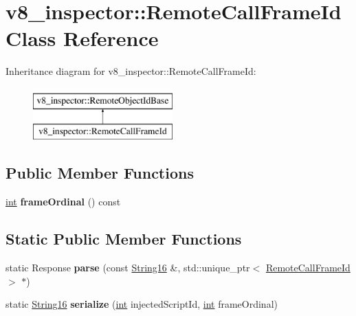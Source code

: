 \hypertarget{classv8__inspector_1_1RemoteCallFrameId}{}\section{v8\+\_\+inspector\+:\+:Remote\+Call\+Frame\+Id Class Reference}
\label{classv8__inspector_1_1RemoteCallFrameId}
Inheritance diagram for v8\+\_\+inspector\+:\+:Remote\+Call\+Frame\+Id\+:\begin{figure}[H]
\begin{center}
\leavevmode
\includegraphics[height=2.000000cm]{classv8__inspector_1_1RemoteCallFrameId}
\end{center}
\end{figure}
\subsection*{Public Member Functions}
\begin{DoxyCompactItemize}
\item 
\mbox{\label{classv8__inspector_1_1RemoteCallFrameId_ada645cb0f67baead45d73d54d6947621}} 
\mbox{\hyperlink{classint}{int}} {\bfseries frame\+Ordinal} () const
\end{DoxyCompactItemize}
\subsection*{Static Public Member Functions}
\begin{DoxyCompactItemize}
\item 
\mbox{\label{classv8__inspector_1_1RemoteCallFrameId_a3f43279be04e0db676aabef95e22fc3f}} 
static Response {\bfseries parse} (const \mbox{\hyperlink{classv8__inspector_1_1String16}{String16}} \&, std\+::unique\+\_\+ptr$<$ \mbox{\hyperlink{classv8__inspector_1_1RemoteCallFrameId}{Remote\+Call\+Frame\+Id}} $>$ $\ast$)
\item 
\mbox{\label{classv8__inspector_1_1RemoteCallFrameId_a5b024568706a3a56c1089615fe62f125}} 
static \mbox{\hyperlink{classv8__inspector_1_1String16}{String16}} {\bfseries serialize} (\mbox{\hyperlink{classint}{int}} injected\+Script\+Id, \mbox{\hyperlink{classint}{int}} frame\+Ordinal)
\end{DoxyCompactItemize}
